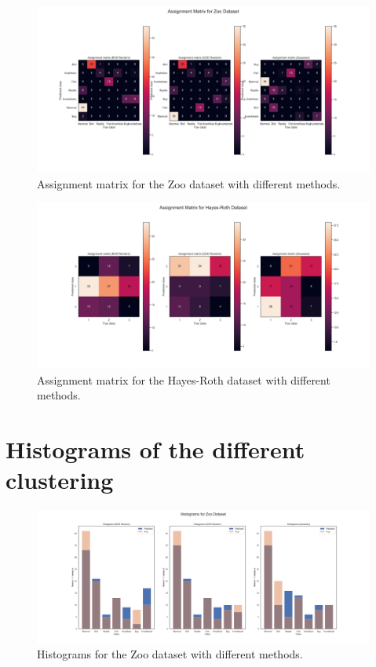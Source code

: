 \begin{figure}[H]
    \centering
    \includegraphics[width=\linewidth]{Attachments/assignment_matrix_zoo.png}
    \caption{Assignment matrix for the Zoo dataset with different methods.}
    \label{fig:assign_zoo}
\end{figure}

\begin{figure}[H]
    \centering
    \includegraphics[width=\linewidth]{Attachments/assignment_matrix_hayes-roth.png}
    \caption{Assignment matrix for the Hayes-Roth dataset with different methods.}
    \label{fig:assign_hr}
\end{figure}

\section{Histograms of the different clustering}
\label{sec:appendix_hist}

\begin{figure}[H]
    \centering
    \includegraphics[width=\linewidth]{Attachments/histograms_zoo.png}
    \caption{Histograms for the Zoo dataset with different methods.}
    \label{fig:hist_zoo}
\end{figure}

